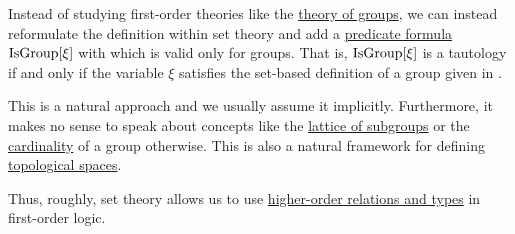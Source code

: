 \begin{remark}\label{rem:first_order_theories_in_zfc}
  Instead of studying first-order theories like the \hyperref[def:group/theory]{theory of groups}, we can instead reformulate the definition within set theory and add a \hyperref[rem:predicate_formula]{predicate formula} \( \operatorname{IsGroup}[\xi] \) with which is valid only for groups. That is, \( \operatorname{IsGroup}[\xi] \) is a tautology if and only if the variable \( \xi \) satisfies the set-based definition of a group given in .

  This is a natural approach and we usually assume it implicitly. Furthermore, it makes no sense to speak about concepts like the \hyperref[thm:substructures_form_complete_lattice]{lattice of subgroups} or the \hyperref[def:cardinal]{cardinality} of a group otherwise. This is also a natural framework for defining \hyperref[def:topological_space]{topological spaces}.

  Thus, roughly, set theory allows us to use \hyperref[rem:higher_order_logic]{higher-order relations and types} in first-order logic.
\end{remark}
